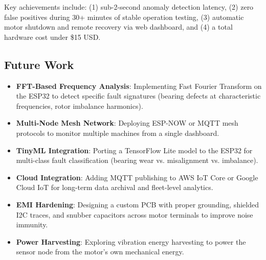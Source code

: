 \documentclass[conference]{IEEEtran}
\begin{document}
Key achievements include: (1) sub-2-second anomaly detection latency, (2) zero false positives during 30+ minutes of stable operation testing, (3) automatic motor shutdown and remote recovery via web dashboard, and (4) a total hardware cost under \$15 USD.

\subsection{Future Work}
\begin{itemize}
    \item \textbf{FFT-Based Frequency Analysis}: Implementing Fast Fourier Transform on the ESP32 to detect specific fault signatures (bearing defects at characteristic frequencies, rotor imbalance harmonics).
    \item \textbf{Multi-Node Mesh Network}: Deploying ESP-NOW or MQTT mesh protocols to monitor multiple machines from a single dashboard.
    \item \textbf{TinyML Integration}: Porting a TensorFlow Lite model to the ESP32 for multi-class fault classification (bearing wear vs. misalignment vs. imbalance).
    \item \textbf{Cloud Integration}: Adding MQTT publishing to AWS IoT Core or Google Cloud IoT for long-term data archival and fleet-level analytics.
    \item \textbf{EMI Hardening}: Designing a custom PCB with proper grounding, shielded I2C traces, and snubber capacitors across motor terminals to improve noise immunity.
    \item \textbf{Power Harvesting}: Exploring vibration energy harvesting to power the sensor node from the motor's own mechanical energy.
\end{itemize}
\end{document}
